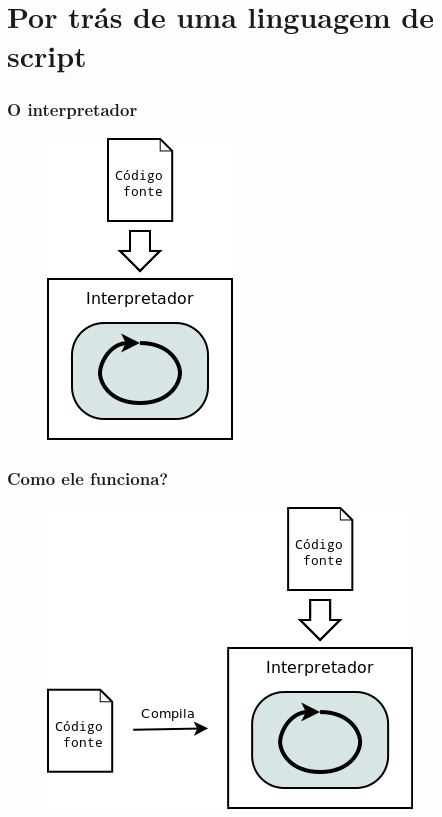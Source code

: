 \documentclass[brazil]{beamer}
\begin{document}
\section{Por trás de uma linguagem de script}
\begin{frame}[fragile]
  \frametitle{O interpretador}
  \begin{figure}
    \includegraphics[height=.5\textheight]{images/interpretador.png}
  \end{figure}
\end{frame}
\begin{frame}[fragile]
  \frametitle{Como ele funciona?}
  \begin{figure}
    \includegraphics[height=.5\textheight]{images/nativo-vs-virtual-01.png}
  \end{figure}
\end{frame}
\end{document}
